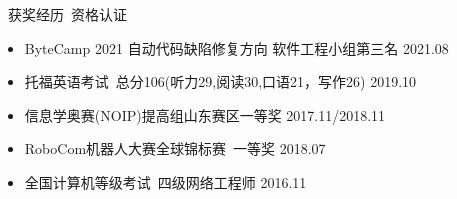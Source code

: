 \documentclass[UTF8]{resume}
\begin{document}
\begin{rSection}{\faAward~获奖经历~资格认证}
    \begin{itemize}
        \itemsep -0.5em
        \item ByteCamp 2021 自动代码缺陷修复方向 软件工程小组第三名 \hfill 2021.08
        \item 托福英语考试~总分106(听力29,阅读30,口语21，写作26) \hfill 2019.10
        \item 信息学奥赛(NOIP)提高组山东赛区一等奖 \hfill 2017.11/2018.11
        \item RoboCom机器人大赛全球锦标赛~一等奖 \hfill 2018.07
        \item 全国计算机等级考试~四级网络工程师 \hfill 2016.11
    \end{itemize}
\end{rSection}
\end{document}
